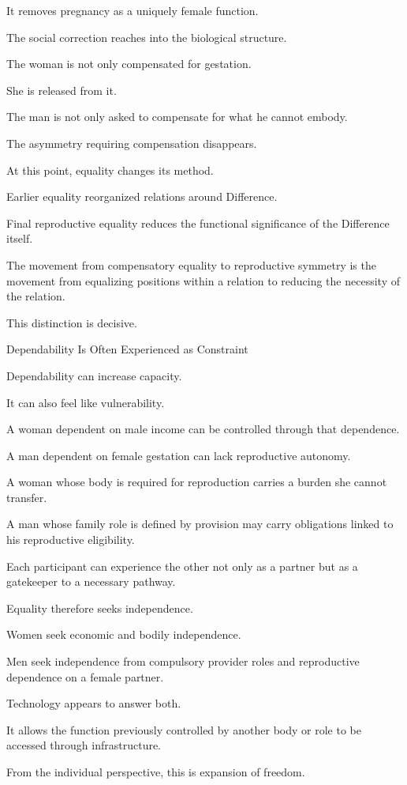 It removes pregnancy as a uniquely female function.

The social correction reaches into the biological structure.

The woman is not only compensated for gestation.

She is released from it.

The man is not only asked to compensate for what he cannot embody.

The asymmetry requiring compensation disappears.

At this point, equality changes its method.

Earlier equality reorganized relations around Difference.

Final reproductive equality reduces the functional significance of the Difference itself.

The movement from compensatory equality to reproductive symmetry is the movement from equalizing positions within a relation to reducing the necessity of the relation.

This distinction is decisive.

Dependability Is Often Experienced as Constraint

Dependability can increase capacity.

It can also feel like vulnerability.

A woman dependent on male income can be controlled through that dependence.

A man dependent on female gestation can lack reproductive autonomy.

A woman whose body is required for reproduction carries a burden she cannot transfer.

A man whose family role is defined by provision may carry obligations linked to his reproductive eligibility.

Each participant can experience the other not only as a partner but as a gatekeeper to a necessary pathway.

Equality therefore seeks independence.

Women seek economic and bodily independence.

Men seek independence from compulsory provider roles and reproductive dependence on a female partner.

Technology appears to answer both.

It allows the function previously controlled by another body or role to be accessed through infrastructure.

From the individual perspective, this is expansion of freedom.


